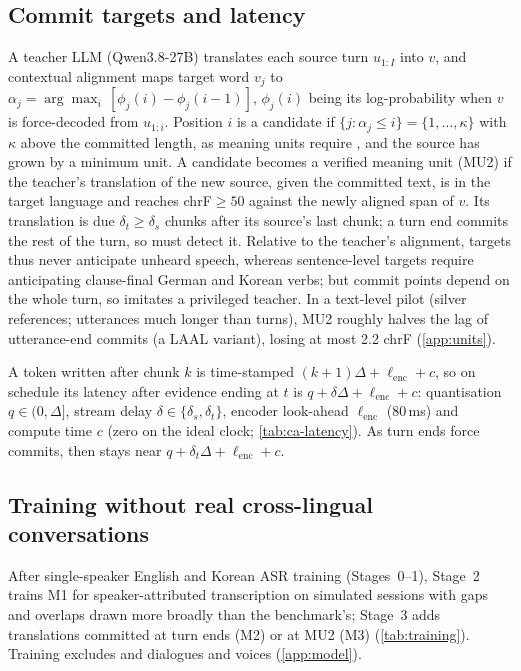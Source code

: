 \subsection{Commit targets and latency}\label{sec:model-targets}\label{sec:model-inference}
A teacher LLM (Qwen3.8-27B) translates each source turn $u_{1:I}$ into $v$, and contextual alignment \citep{labiausse2025highfidelity} maps target word $v_j$ to $\alpha_j=\arg\max_i\,[\phi_j(i)-\phi_j(i-1)]$, $\phi_j(i)$ being its log-probability when $v$ is force-decoded from $u_{1:i}$.
Position $i$ is a candidate if $\{j:\alpha_j\le i\}=\{1,\dots,\kappa\}$ with $\kappa$ above the committed length, as meaning units require \citep{zhang2020learning}, and the source has grown by a minimum unit.
A candidate becomes a verified meaning unit (MU2) if the teacher's translation of the new source, given the committed text, is in the target language and reaches chrF${}\ge50$ against the newly aligned span of $v$.
Its translation is due $\delta_t\ge\delta_s$ chunks after its source's last chunk; a turn end commits the rest of the turn, so \model must detect it.
Relative to the teacher's alignment, targets thus never anticipate unheard speech, whereas sentence-level targets \citep{ma2019stacl} require anticipating clause-final German and Korean verbs; but commit points depend on the whole turn, so \model imitates a privileged teacher.
In a text-level  pilot (silver references; utterances much longer than \taxi turns), MU2 roughly halves the lag of utterance-end commits (a LAAL variant), losing at most 2.2 chrF (\cref{app:units}).

A token written after chunk $k$ is time-stamped $(k+1)\Delta+\ell_{\mathrm{enc}}+c$, so on schedule its latency after evidence ending at $t$ is $q+\delta\Delta+\ell_{\mathrm{enc}}+c$: quantisation $q\in(0,\Delta]$, stream delay $\delta\in\{\delta_s,\delta_t\}$, encoder look-ahead $\ell_{\mathrm{enc}}$ (80\,ms) and compute time $c$ (zero on the ideal clock; \cref{tab:ca-latency}).
As turn ends force commits, \eo then stays near $q+\delta_t\Delta+\ell_{\mathrm{enc}}+c$.

\subsection{Training without real cross-lingual conversations}\label{sec:model-training}
After single-speaker English and Korean ASR training (Stages~0--1), Stage~2 trains M1 for speaker-attributed transcription on simulated sessions with gaps and overlaps drawn more broadly than the benchmark's; Stage~3 adds translations committed at turn ends (M2) or at MU2 (M3) (\cref{tab:training}).
Training excludes \taxi and \syn dialogues and voices (\cref{app:model}).
